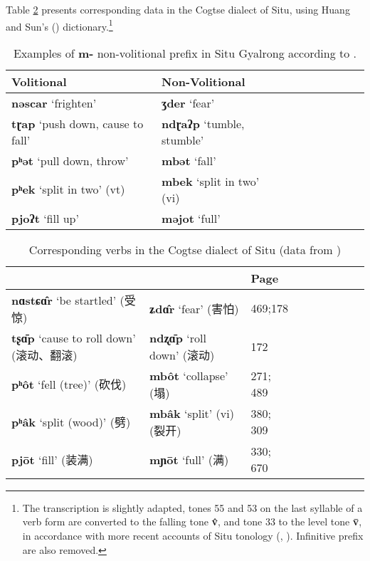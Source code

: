 \documentclass[oneside,a4paper,11pt]{article}
\newcommand{\ipa}[1]{\textbf{{\phon\mbox{#1}}}} %
\newcommand{\zh}[1]{{\cn #1}}
\begin{document}
Table \ref{tab:nonvol2} presents corresponding data in the Cogtse dialect of Situ, using Huang and Sun's (\citeyear{huangsun02}) dictionary.\footnote{The transcription is slightly adapted, tones 55 and 53 on the last syllable of a verb form are converted to the falling tone \ipa{v̂}, and tone 33 to the level tone \ipa{v̄}, in accordance with more recent accounts of Situ tonology (\citealt{jackson05yingao}, \citealt{linyj12tone}). Infinitive prefix are also removed.}

\begin{table}[h]
\caption{Examples of \ipa{m-} non-volitional prefix in Situ Gyalrong according to \citet[505]{prins16kyomkyo}. } \label{tab:nonvol} \centering
\begin{tabular}{lllllllll}
\toprule
Volitional & Non-Volitional \\
\midrule
\ipa{nəscar} `frighten' & \ipa{ʒder} `fear'  \\
\ipa{tɽap} `push down, cause to fall' & \ipa{ndɽaʔp} `tumble, stumble'  \\
\ipa{pʰət} `pull down, throw' & \ipa{mbət} `fall'  \\
\ipa{pʰek} `split in two' (vt)& \ipa{mbek} `split in two' (vi)  \\
\ipa{pjoʔt} `fill up' & \ipa{məjot} `full'  \\
\bottomrule
\end{tabular}
\end{table}

\begin{table}[h]
\caption{Corresponding verbs in the Cogtse dialect of Situ (data from \citealt{huangsun02})} \label{tab:nonvol2} \centering
\begin{tabular}{lllllllll}
\toprule
&&Page \\
\midrule 
 \ipa{nɑstɕɑ̂r}  `be startled' (\zh{受惊}) &  \ipa{ʑdɑ̂r}  `fear' (\zh{害怕}) &  469;178  \\
\ipa{tʂɑ̄p}   `cause to roll down' (\zh{滚动、翻滚}) &  \ipa{ndʐɑ̄p} `roll down' (\zh{滚动})   &  172  \\
 \ipa{pʰôt} `fell (tree)' (\zh{砍伐}) & \ipa{mbôt} `collapse' (\zh{塌}) & 271; 489 \\
 \ipa{pʰâk} `split (wood)' (\zh{劈}) & \ipa{mbâk} `split' (vi) (\zh{裂开}) & 380; 309 \\
\ipa{pjōt} `fill' (\zh{装满}) & \ipa{mɲōt} `full' (\zh{满}) & 330; 670 \\
\bottomrule
\end{tabular}
\end{table}
\end{document}
